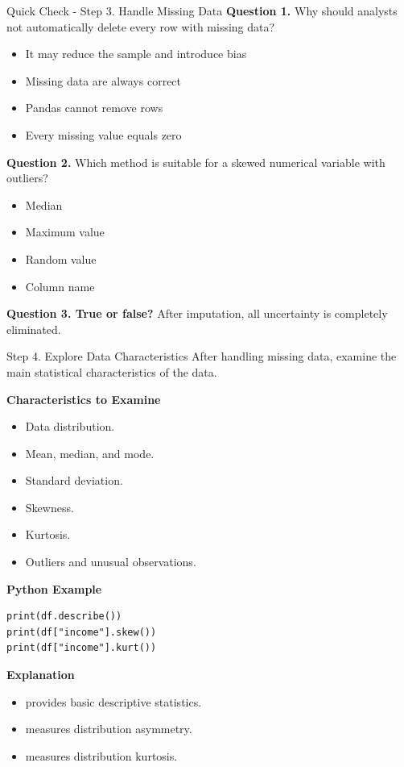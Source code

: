\documentclass[aspectratio=169,11pt]{beamer}
\begin{document}
\begin{frame}[allowframebreaks]{Quick Check - Step 3. Handle Missing Data}
\footnotesize
\textbf{Question 1.} Why should analysts not automatically delete every row with missing data?\par\medskip
\begin{itemize}
\item[\textbf{A.}] It may reduce the sample and introduce bias
\item[\textbf{B.}] Missing data are always correct
\item[\textbf{C.}] Pandas cannot remove rows
\item[\textbf{D.}] Every missing value equals zero
\end{itemize}
\textbf{Question 2.} Which method is suitable for a skewed numerical variable with outliers?\par\medskip
\begin{itemize}
\item[\textbf{A.}] Median
\item[\textbf{B.}] Maximum value
\item[\textbf{C.}] Random value
\item[\textbf{D.}] Column name
\end{itemize}
\textbf{Question 3. True or false?} After imputation, all uncertainty is completely eliminated.\par\medskip
\end{frame}
\begin{frame}{Step 4. Explore Data Characteristics}
\small
After handling missing data, examine the main statistical characteristics of the data.\par\medskip
\textbf{Characteristics to Examine}\par\medskip
\begin{itemize}
\item Data distribution.
\item Mean, median, and mode.
\item Standard deviation.
\item Skewness.
\item Kurtosis.
\item Outliers and unusual observations.
\end{itemize}
\textbf{Python Example}\par\medskip
\begin{lstlisting}[style=py]
print(df.describe())
print(df["income"].skew())
print(df["income"].kurt())
\end{lstlisting}
\textbf{Explanation}\par\medskip
\begin{itemize}
\item \texttt{} provides basic descriptive statistics.
\item \texttt{} measures distribution asymmetry.
\item \texttt{} measures distribution kurtosis.
\end{itemize}
\end{frame}
\end{document}
